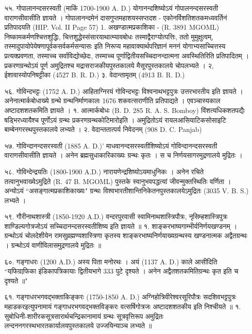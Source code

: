 ५५. गोपालानन्दसरस्वती (माकिं 1700-1900 A. D.)
योगानन्दशिष्योऽयं गोपालनन्दसरस्वती वाराणसीवासीति ज्ञायते । गोपालानन्दमेनं दासगुप्तमहाशयस्सप्तदश - एकोनर्विशतिशतकमध्यवर्तिनं प्रतिपादयति (HIP. Vol. II Page 57)
1. अखण्डात्मप्रकाशिका - (R. 3891 MGOML)
निष्कामकर्मणश्चित्तशुद्धिः, चित्तशुद्धेस्संसारयाथात्म्यावबोधः तस्माद्वैराग्योत्पत्तिः, ततो मुमुक्षुत्वम्, तस्मादुपायोपेयेषणापूर्वकसर्वकर्मसन्यासः इति निरूप्य महावाक्यार्थपरिज्ञानं मननं योगाभ्यसाच्चित्तस्य प्रत्यक्प्रवणता, तस्माच्च सर्वाविद्योच्छेदः, तस्माच्च पूर्णाद्वितीयसच्चिदानन्दात्मना अवस्थितिरिति प्रतिपादितम् । प्रकरणग्रन्थोऽयं पूर्ण अमुद्रितश्च मद्रासराजकीयपुस्तकालये मैसूरपुस्तकालये चोपलभ्यते ।
२, ईशावास्योपनिषट्टीका (4527 B. R. D.)
३. वेदान्तामृतम् (4913 B. R. D.)

५६. गोविन्दभट्टः (1752 A. D.)
आहिताग्निरयं गोविन्दभट्टः विश्वनाथभट्टपुत्रः उत्तरभारतीय इति ज्ञायते । अनेनात्मार्कबोधाख्ये ग्रन्थे ग्रन्थनिर्माणकालः 1676 शकवत्सराणीति प्रतिपाद्यते । एवञ्चास्यकाल अष्टादशशतकमिति ज्ञायते ।
१. आत्मार्कबोधः (B. D. 285 R. A. S. Bomboy)
विंशत्यधिकशतपद्यैः षड्भिरध्यायैश्च पूर्णोऽयं ग्रन्थः प्रकरणग्रन्थकोटिमारोइति । अमुद्रितोऽयं रायलआसियाटिकसोसाइटि बाम्बेनगरस्थपुस्तकालये लभ्यते ।
२. वेदान्ततात्पर्य निवेदनम् (908 D. C. Panjab)

५७. गोविन्दानन्दसरस्वती (1885 A. D.)'
माधवानन्दसरस्वतीशिष्योऽयं गोविन्दानन्दसरस्वती वाराणसीवासीति ज्ञायते । अनेन ब्रह्मसुधाकारिकाख्यः ग्रन्थः कृतः । स च निर्णयसागरमुद्रणालये मुद्रितः ।

५८. गोविन्देन्द्रयतिः (1800-1900 A.D.)
नारायणेन्द्रशिष्योऽयमाधुनिकः । अनेन रचिते तत्वानुभवाख्येऽमुद्रिते (R. 47 B. MGOML) पुस्तके स्वानुभवपद्धत्यां जीवन्मुक्तस्थितिः वर्णिता । अन्योऽयं ``असङ्गात्मप्रकाशिकाख्यः" ग्रन्थः विश्वभारतीशान्तिनिकेतनपुस्तकालयेऽमुद्रितः (3035 V. B. S.) लभ्यते ।

५९. गौरीनाथशास्त्री (1850-1920 A.D.)
वन्दरपुरवासी स्वामिनाथशास्त्रिपौत्रः, नृसिम्हशास्त्रिपुत्रः शाण्डिल्यगोत्रजोऽयं सच्चिदानन्दसरस्वतीशिष्य इति ज्ञायते ॥
१. शाङ्करभाष्यगाम्भीर्यनिर्णयखण्डनम् । ग्रन्थोऽयं चोलदेशीयेन रामसुव्रह्मण्यशास्त्रिणा कृतस्य शाङ्करभाष्यनिर्णयाख्यग्रन्थस्य खण्डनात्मक अद्वैतग्रन्थः । ग्रन्थोऽयं वाणीविलासमुद्रणालये मुद्रितः ॥

६०. गङ्गाधरः (1200 A.D.)
अस्य पिता मनोरथः । अयं (1137 A. D.) काले आसीदिति ``यफि़ग्राफि़का इंडिकापत्रिकायाः द्वितीयभागे 333 पुटे दृश्यते । अनेन अद्वैतशतकमितिग्रन्थः कृत इति च दृश्यते ॥"

६१. गङ्गाधरभगवद्भक्ताकिङ्करः (1750-1850 A. D.)
अग्निहोत्रिवीरेश्वरसूरिपौत्रः सदशिवभट्टपुत्रः महाडकरइत्युपनामायं गङ्गाधरभगवद्भक्तविङ्करः वत्सर्षिगोत्रजः अष्टादशशतकीय इति निश्चीयते ॥
१. सुबोधिनी-शारीरकसूत्रसारार्थचन्द्रिकानामायं ग्रन्थः सूत्रवृत्तिरूप अमुद्रितः लन्दननगरस्थभारतकार्यालयपुस्तकालये उज्जयिन्याञ्च लभ्यते ॥

